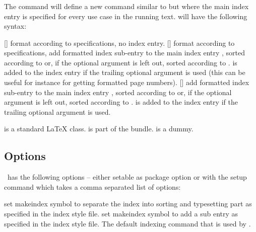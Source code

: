 \documentclass[load-preamble,add-index,scrartcl={DIV10}]{cnltx-doc}
\begin{document}
\subsubsection{}\label{sec:command:usage:newsubmainidxcmd}
The command  will define
a new command  similar to  but where the main
index entry is specified for every use case in the running text.  
will have the following syntax:
\begin{commands}
  [\sarg{}]
    format  according to specifications, no index entry.
  []
    format  according to specifications, add formatted index
    sub-entry to the main index entry , sorted according to
     or, if the optional argument is left out, sorted
    according to .   is added to the index entry if
    the trailing optional argument is used (this can be useful for instance
    for getting formatted page numbers).
  []
    add formatted index sub-entry to the main index entry ,
    sorted according to  or, if the optional argument is left
    out, sorted according to .   is added to the
    index entry if the trailing optional argument is used.
\end{commands}

\begin{example}
   is a standard \LaTeX{} class.
   is part of the \KOMAScript{} bundle.
   is a dummy.
\end{example}

\subsection{Options}
\idxcmds\ has the following options -- either setable as package option or with
the setup command  which takes a comma separated
list of options:
\begin{options}
    set makeindex symbol to separate the index into sorting and typesetting
    part as specified in the index style file.
  \Default{!}
    set makeindex symbol to add a sub entry as specified in the index style
    file.
    The default indexing command that is used by \idxcmds.
\end{options}
\end{document}
